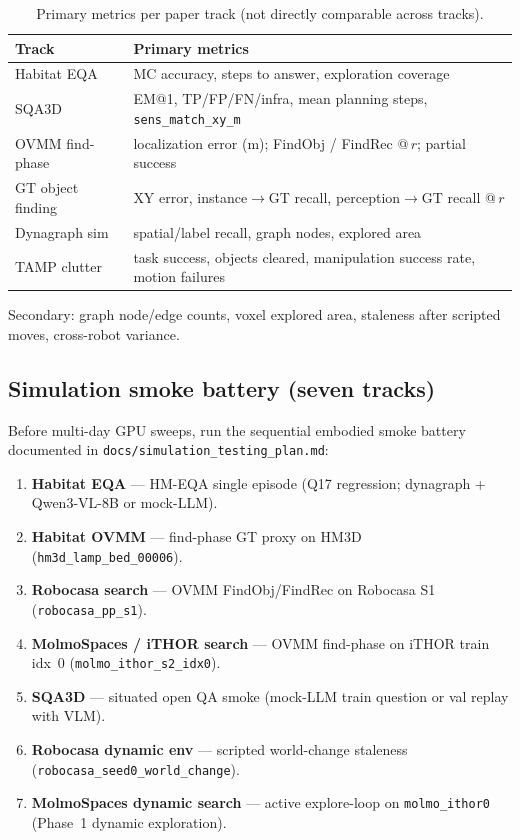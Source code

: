 \begin{table}[t]
  \centering
  \caption{Primary metrics per paper track (not directly comparable across tracks).}
  \label{tab:benchmark_metrics}
  \small
  \begin{tabular}{@{}ll@{}}
    \toprule
    Track & Primary metrics \\
    \midrule
    Habitat EQA & MC accuracy, steps to answer, exploration coverage \\
    SQA3D & EM@1, TP/FP/FN/infra, mean planning steps, \texttt{sens\_match\_xy\_m} \\
    OVMM find-phase & localization error (m); FindObj / FindRec @\,$r$; partial success \\
    GT object finding & XY error, instance$\rightarrow$GT recall, perception$\rightarrow$GT recall @\,$r$ \\
    Dynagraph sim & spatial/label recall, graph nodes, explored area \\
    TAMP clutter & task success, objects cleared, manipulation success rate, motion failures \\
    \bottomrule
  \end{tabular}
\end{table}

Secondary: graph node/edge counts, voxel explored area, staleness after scripted moves, cross-robot variance.

\subsection{Simulation smoke battery (seven tracks)}
\label{sec:sim_smoke_battery}

Before multi-day GPU sweeps, run the sequential embodied smoke battery documented in \texttt{docs/simulation\_testing\_plan.md}:

\begin{enumerate}
  \item \textbf{Habitat EQA} --- HM-EQA single episode (Q17 regression; dynagraph + Qwen3-VL-8B or mock-LLM).
  \item \textbf{Habitat OVMM} --- find-phase GT proxy on HM3D (\texttt{hm3d\_lamp\_bed\_00006}).
  \item \textbf{Robocasa search} --- OVMM FindObj/FindRec on Robocasa S1 (\texttt{robocasa\_pp\_s1}).
  \item \textbf{MolmoSpaces / iTHOR search} --- OVMM find-phase on iTHOR train idx~0 (\texttt{molmo\_ithor\_s2\_idx0}).
  \item \textbf{SQA3D} --- situated open QA smoke (mock-LLM train question or val replay with VLM).
  \item \textbf{Robocasa dynamic env} --- scripted world-change staleness (\texttt{robocasa\_seed0\_world\_change}).
  \item \textbf{MolmoSpaces dynamic search} --- active explore-loop on \texttt{molmo\_ithor0} (Phase~1 dynamic exploration).
\end{enumerate}

